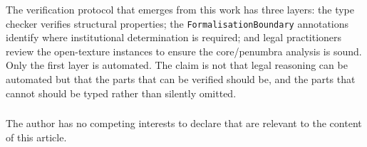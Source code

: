 \documentclass[runningheads]{llncs}
\begin{document}
The verification protocol that emerges from this work has three layers: the type
checker verifies structural properties; the \texttt{FormalisationBoundary}
annotations identify where institutional determination is required; and legal
practitioners review the open-texture instances to ensure the core/penumbra
analysis is sound. Only the first layer is automated. The claim is not that legal
reasoning can be automated but that the parts that can be verified should be, and
the parts that cannot should be typed rather than silently omitted.

\begin{credits}
\subsubsection{\discintname}
The author has no competing interests to declare that are relevant to the content
of this article.
\end{credits}



\end{document}
